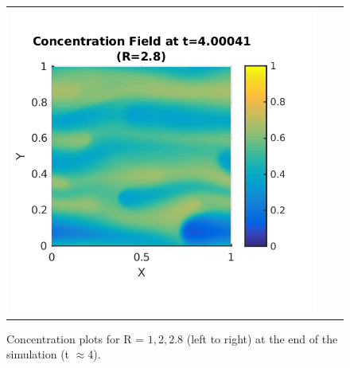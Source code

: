 \documentclass{article}
\begin{document}
\begin{enumerate}
\begin{figure}[!ht]
\begin{tabular}{c c c}
\includegraphics[scale=0.5]{conc28_400.png}
\end{tabular}
\caption{Concentration plots for R = $1, 2, 2.8$ (left to right) at the end of the simulation (t $\approx 4$).}
\label{fig:final-conc}
\end{figure}

\clearpage


\end{enumerate}
\end{document}
